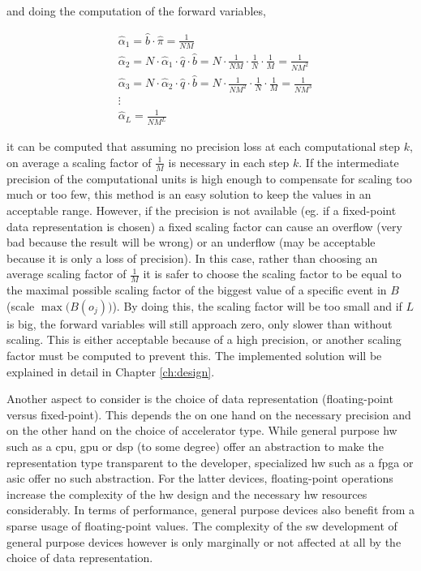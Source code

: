 \documentclass[mscthesis]{usiinfthesis}
\begin{document}
and doing the computation of the forward variables,

\begin{equation}\begin{split}
    \label{eq:scaling_estimation}
    &\hat{\alpha}_1 = \hat{b} \cdot \hat{\pi} = \frac{1}{NM} \\
    &\hat{\alpha}_2 = N \cdot \hat{\alpha}_1 \cdot \hat{q} \cdot \hat{b} =
        N \cdot \frac{1}{NM} \cdot \frac{1}{N} \cdot \frac{1}{M} =
        \frac{1}{NM^2} \\
    &\hat{\alpha}_3 = N \cdot \hat{\alpha}_2 \cdot \hat{q} \cdot \hat{b} =
        N \cdot \frac{1}{NM^2} \cdot \frac{1}{N} \cdot \frac{1}{M} =
        \frac{1}{NM^3} \\
    &\vdots\\
    & \hat{\alpha}_L = \frac{1}{NM^L}
\end{split}\end{equation}

it can be computed that assuming no precision loss at each computational step
$k$, on average a scaling factor of $\frac{1}{M}$ is necessary in each step
$k$. If the intermediate precision of the computational units is high enough to
compensate for scaling too much or too few, this method is an easy solution to
keep the values in an acceptable range. However, if the precision is not
available (eg. if a fixed-point data representation is chosen) a fixed scaling
factor can cause an overflow (very bad because the result will be wrong) or an
underflow (may be acceptable because it is only a loss of precision). In this
case, rather than choosing an average scaling factor of $\frac{1}{M}$ it is
safer to choose the scaling factor to be equal to the maximal possible scaling
factor of the biggest value of a specific event in $B$ (scale
$\max\big(B(o_j)\big)$). By doing this, the scaling factor will be too small
and if $L$ is big, the forward variables will still approach zero, only slower
than without scaling. This is either acceptable because of a high precision,
or another scaling factor must be computed to prevent this. The implemented
solution will be explained in detail in Chapter \ref{ch:design}.

Another aspect to consider is the choice of data representation (floating-point
versus fixed-point). This depends the on one hand on the necessary precision
and on the other hand on the choice of accelerator type. While general purpose
\gls{hw} such as a \gls{cpu}, \gls{gpu} or \gls{dsp} (to some degree) offer an
abstraction to make the representation type transparent to the developer,
specialized \gls{hw} such as a \gls{fpga} or \gls{asic} offer no such
abstraction. For the latter devices, floating-point operations increase the
complexity of the \gls{hw} design and the necessary \gls{hw} resources
considerably. In terms of performance, general purpose devices also benefit
from a sparse usage of floating-point values. The complexity of the \gls{sw}
development of general purpose devices however is only marginally or not
affected at all by the choice of data representation.
\end{document}
